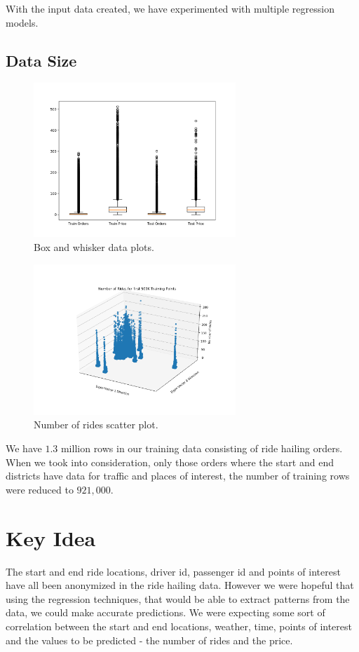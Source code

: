 \documentclass[paper=a4, fontsize=11pt]{scrartcl} %
\numberwithin{equation}{section} %
\numberwithin{table}{section} %
\begin{document}
With the input data created, we have experimented with multiple regression models.

\subsection{Data Size}

\begin{figure}[!htb]
\centering
\includegraphics[width=3in]{figures/boxplots.png}
\caption{Box and whisker data plots.}
\label{boxplots}
\end{figure}


\begin{figure}[!htb]
\centering
\includegraphics[width=3in]{figures/Rides3DScatter.png}
\caption{Number of rides scatter plot.}
\label{rides}
\end{figure}
We have $1.3$ million rows in our training data consisting of ride hailing orders. When we took into consideration, only those orders where the start and end districts have data for traffic and places of interest, the number of training rows were reduced to $921,000$.

\section{Key Idea}

The start and end ride locations, driver id, passenger id and points of interest have all been anonymized in the ride hailing data. However we were hopeful that using the regression techniques, that would be able to extract patterns from the data, we could make accurate predictions. We were expecting some sort of correlation between the start and end locations, weather, time, points of interest and the values to be predicted - the number of rides and the price.\\
\end{document}
